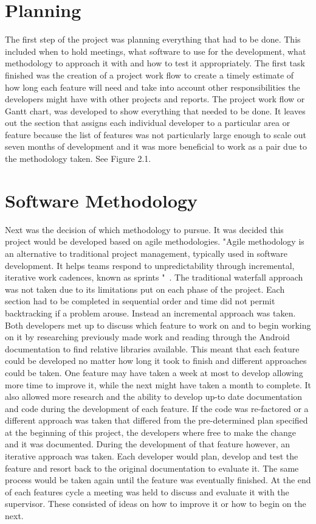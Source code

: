\section{Planning}
The first step of the project was planning everything that had to be done. This included when to hold meetings, what software to use for the development, what methodology to approach it with and how to test it appropriately. The first task finished was the creation of a project work flow to create a timely estimate of how long each feature will need and take into account other responsibilities the developers might have with other projects and reports. The project work flow or Gantt chart, was developed to show everything that needed to be done. It leaves out the section that assigns each individual developer to a particular area or feature because the list of features was not particularly large enough to scale out seven months of development and it was more beneficial to work as a pair due to the methodology taken. See Figure 2.1.

\section{Software Methodology}
Next was the decision of which methodology to pursue. It was decided this project would be developed based on agile methodologies. "Agile methodology is an alternative to traditional project management, typically used in software development. It helps teams respond to unpredictability through incremental, iterative work cadences, known as sprints "~\cite{agile}. The traditional waterfall approach was not taken due to its limitations put on each phase of the project. Each section had to be completed in sequential order and time did not permit backtracking if a problem arouse. Instead an incremental approach was taken. Both developers met up to discuss which feature to work on and to begin working on it by researching previously made work and reading through the Android documentation to find relative libraries available. This meant that each feature could be developed no matter how long it took to finish and different approaches could be taken. One feature may have taken a week at most to develop allowing  more time to improve it, while the next might have taken a month to complete. It also allowed more research and the ability to develop up-to date documentation and code during the development of each feature. If the code was re-factored or a different approach was taken that differed from the pre-determined plan specified at the beginning of this project, the developers where free to make the change and it was documented. During the development of that feature however, an iterative approach was taken. Each developer would plan, develop and test the feature and resort back to the original documentation to evaluate it. The same process would be taken again until the feature was eventually finished. At the end of each features cycle a meeting was held to discuss and evaluate it with the supervisor. These consisted of ideas on how to improve it or how to begin on the next. 

